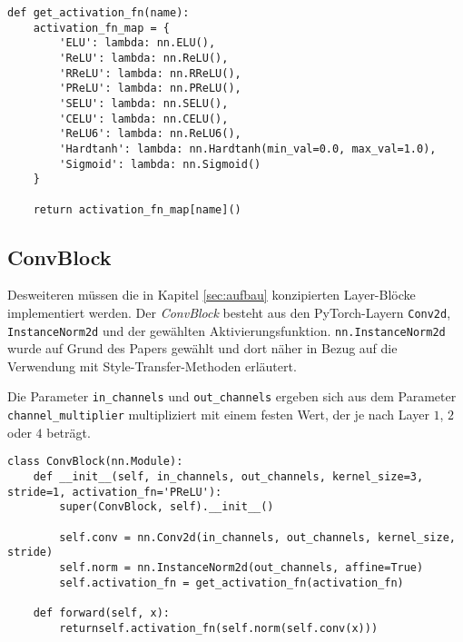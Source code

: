 \begin{listing}[ht]
\begin{verbatim}
def get_activation_fn(name):
    activation_fn_map = {
        'ELU': lambda: nn.ELU(),
        'ReLU': lambda: nn.ReLU(),
        'RReLU': lambda: nn.RReLU(),
        'PReLU': lambda: nn.PReLU(),
        'SELU': lambda: nn.SELU(),
        'CELU': lambda: nn.CELU(),
        'ReLU6': lambda: nn.ReLU6(),
        'Hardtanh': lambda: nn.Hardtanh(min_val=0.0, max_val=1.0),
        'Sigmoid': lambda: nn.Sigmoid()
    }

    return activation_fn_map[name]()
\end{verbatim}
\end{listing}

\subsection{ConvBlock}

Desweiteren müssen die in Kapitel \ref{sec:aufbau} konzipierten Layer-Blöcke implementiert werden.
Der \textit{ConvBlock} besteht aus den PyTorch-Layern \texttt{Conv2d}, \texttt{InstanceNorm2d} und der gewählten Aktivierungsfunktion.
\texttt{nn.InstanceNorm2d} wurde auf Grund des Papers \cite{DBLP:journals/corr/UlyanovVL16} gewählt und dort näher in Bezug auf die Verwendung mit Style-Transfer-Methoden erläutert.

\pagebreak

Die Parameter \texttt{in_channels} und \texttt{out_channels} ergeben sich aus dem Parameter \texttt{channel_multiplier} multipliziert mit einem festen Wert, der je nach Layer $ 1 $, $ 2 $ oder $ 4 $ beträgt.

\begin{listing}[ht]
\begin{verbatim}
class ConvBlock(nn.Module):
    def __init__(self, in_channels, out_channels, kernel_size=3, stride=1, activation_fn='PReLU'):
        super(ConvBlock, self).__init__()

        self.conv = nn.Conv2d(in_channels, out_channels, kernel_size, stride)
        self.norm = nn.InstanceNorm2d(out_channels, affine=True)
        self.activation_fn = get_activation_fn(activation_fn)

    def forward(self, x):
        returnself.activation_fn(self.norm(self.conv(x)))
\end{verbatim}
\end{listing}

